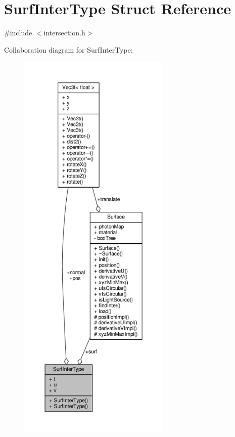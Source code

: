 \hypertarget{structSurfInterType}{}\section{Surf\+Inter\+Type Struct Reference}
\label{structSurfInterType}


{\ttfamily \#include $<$intersection.\+h$>$}



Collaboration diagram for Surf\+Inter\+Type\+:
\nopagebreak
\begin{figure}[H]
\begin{center}
\leavevmode
\includegraphics[height=550pt]{structSurfInterType__coll__graph}
\end{center}
\end{figure}
